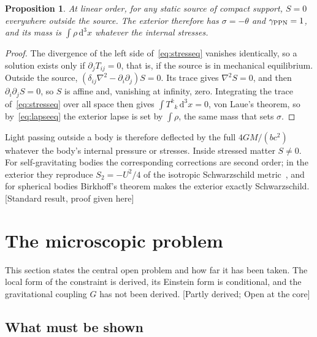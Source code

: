 \documentclass[11pt]{article}
\newcommand{\thP}{\theta}             %
\newcommand{\sgP}{\sigma}             %
\newcommand{\dd}{\mathrm{d}}
\newcommand{\st}[1]{\textsf{\small[#1]}}
\theoremstyle{plain}
\newtheorem{proposition}{Proposition}
\theoremstyle{definition}
\theoremstyle{remark}
\begin{document}
\begin{proposition}\label{prop:exterior}
At linear order, for any static source of compact support, $S=0$ everywhere outside the source. The exterior therefore has $\sgP=-\thP$ and $\gamma_{\rm PPN}=1$, and its mass is $\int\rho\,\dd^3x$ whatever the internal stresses.
\end{proposition}

\begin{proof}
The divergence of the left side of~\eqref{eq:stresseq} vanishes identically, so a solution exists only if $\partial_jT_{ij}=0$, that is, if the source is in mechanical equilibrium. Outside the source, $(\delta_{ij}\nabla^2-\partial_i\partial_j)S=0$. Its trace gives $\nabla^2S=0$, and then $\partial_i\partial_jS=0$, so $S$ is affine and, vanishing at infinity, zero. Integrating the trace of~\eqref{eq:stresseq} over all space then gives $\int T^k{}_k\,\dd^3x=0$, von Laue's theorem, so by~\eqref{eq:lapseeq} the exterior lapse is set by $\int\rho$, the same mass that sets $\sgP$.
\end{proof}

Light passing outside a body is therefore deflected by the full $4GM/(bc^2)$ whatever the body's internal pressure or stresses. Inside stressed matter $S\neq0$. For self-gravitating bodies the corresponding corrections are second order; in the exterior they reproduce $S_2=-U^2/4$ of the isotropic Schwarzschild metric~\cite{JordanHDA}, and for spherical bodies Birkhoff's theorem makes the exterior exactly Schwarzschild. \st{Standard result, proof given here}

\section{The microscopic problem}
\label{sec:micro}

This section states the central open problem and how far it has been taken. The local form of the constraint is derived, its Einstein form is conditional, and the gravitational coupling $G$ has not been derived. \st{Partly derived; Open at the core}

\subsection{What must be shown}
\end{document}
